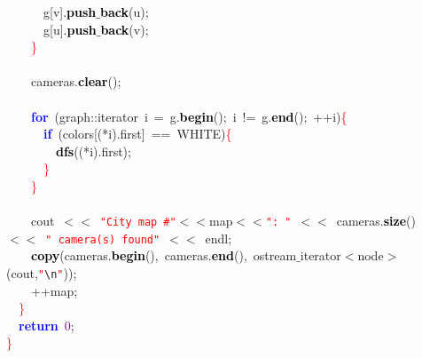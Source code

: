 \documentclass[10pt,a4paper,twoside]{article}
\begin{document}
{{{{{{{{\mbox{}\ \ \ \ \ \ g\textcolor{BrickRed}{[}v\textcolor{BrickRed}{].}\textbf{\textcolor{Black}{push$\_$back}}\textcolor{BrickRed}{(}u\textcolor{BrickRed}{);} \\
\mbox{}\ \ \ \ \ \ g\textcolor{BrickRed}{[}u\textcolor{BrickRed}{].}\textbf{\textcolor{Black}{push$\_$back}}\textcolor{BrickRed}{(}v\textcolor{BrickRed}{);} \\
\mbox{}\ \ \ \ \textcolor{Red}{\}} \\
\mbox{}\ \ \ \  \\
\mbox{}\ \ \ \ cameras\textcolor{BrickRed}{.}\textbf{\textcolor{Black}{clear}}\textcolor{BrickRed}{();} \\
\mbox{}\ \ \ \  \\
\mbox{}\ \ \ \ \textbf{\textcolor{Blue}{for}}\ \textcolor{BrickRed}{(}graph\textcolor{BrickRed}{::}iterator\ i\ \textcolor{BrickRed}{=}\ g\textcolor{BrickRed}{.}\textbf{\textcolor{Black}{begin}}\textcolor{BrickRed}{();}\ i\ \textcolor{BrickRed}{!=}\ g\textcolor{BrickRed}{.}\textbf{\textcolor{Black}{end}}\textcolor{BrickRed}{();}\ \textcolor{BrickRed}{++}i\textcolor{BrickRed}{)}\textcolor{Red}{\{} \\
\mbox{}\ \ \ \ \ \ \textbf{\textcolor{Blue}{if}}\ \textcolor{BrickRed}{(}colors\textcolor{BrickRed}{[(*}i\textcolor{BrickRed}{).}first\textcolor{BrickRed}{]}\ \textcolor{BrickRed}{==}\ WHITE\textcolor{BrickRed}{)}\textcolor{Red}{\{} \\
\mbox{}\ \ \ \ \ \ \ \ \textbf{\textcolor{Black}{dfs}}\textcolor{BrickRed}{((*}i\textcolor{BrickRed}{).}first\textcolor{BrickRed}{);} \\
\mbox{}\ \ \ \ \ \ \textcolor{Red}{\}} \\
\mbox{}\ \ \ \ \textcolor{Red}{\}} \\
\mbox{}\ \ \ \ \ \  \\
\mbox{}\ \ \ \ cout\ \textcolor{BrickRed}{$<<$}\ \texttt{\textcolor{Red}{"{}City\ map\ \#"{}}}\textcolor{BrickRed}{$<<$}map\textcolor{BrickRed}{$<<$}\texttt{\textcolor{Red}{"{}:\ "{}}}\ \textcolor{BrickRed}{$<<$}\ cameras\textcolor{BrickRed}{.}\textbf{\textcolor{Black}{size}}\textcolor{BrickRed}{()}\ \textcolor{BrickRed}{$<<$}\ \texttt{\textcolor{Red}{"{}\ camera(s)\ found"{}}}\ \textcolor{BrickRed}{$<<$}\ endl\textcolor{BrickRed}{;} \\
\mbox{}\ \ \ \ \textbf{\textcolor{Black}{copy}}\textcolor{BrickRed}{(}cameras\textcolor{BrickRed}{.}\textbf{\textcolor{Black}{begin}}\textcolor{BrickRed}{(),}\ cameras\textcolor{BrickRed}{.}\textbf{\textcolor{Black}{end}}\textcolor{BrickRed}{(),}\ ostream$\_$iterator\textcolor{BrickRed}{$<$}node\textcolor{BrickRed}{$>$(}cout\textcolor{BrickRed}{,}\texttt{\textcolor{Red}{"{}}}\texttt{\textcolor{CarnationPink}{\textbackslash{}n}}\texttt{\textcolor{Red}{"{}}}\textcolor{BrickRed}{));} \\
\mbox{}\ \ \ \ \textcolor{BrickRed}{++}map\textcolor{BrickRed}{;} \\
\mbox{}\ \ \textcolor{Red}{\}} \\
\mbox{}\ \ \textbf{\textcolor{Blue}{return}}\ \textcolor{Purple}{0}\textcolor{BrickRed}{;} \\
\mbox{}\textcolor{Red}{\}} \\

}}}}}}}}
\end{document}
